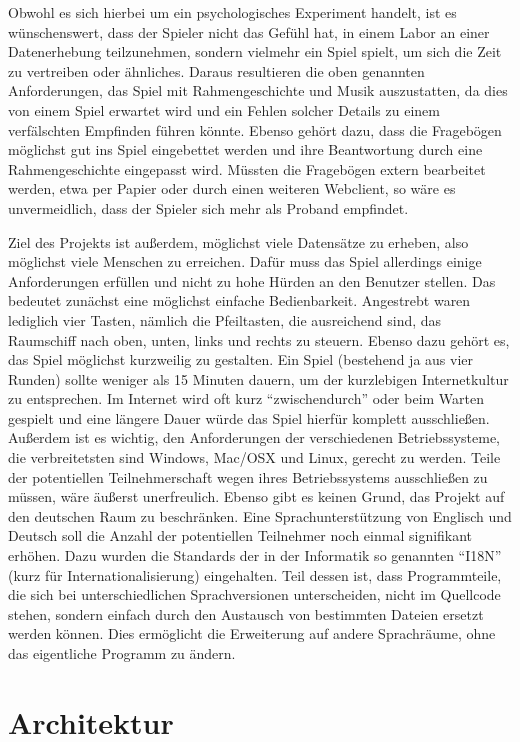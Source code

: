 \documentclass[a4paper,12pt]{scrartcl}
\begin{document}
Obwohl es sich hierbei um ein psychologisches Experiment handelt, ist es wünschenswert,
dass der Spieler nicht das Gefühl hat, in einem Labor an einer Datenerhebung
teilzunehmen, sondern vielmehr ein Spiel spielt, um sich die Zeit zu vertreiben oder
ähnliches. Daraus resultieren die oben genannten Anforderungen, das Spiel mit
Rahmengeschichte und Musik auszustatten, da dies von einem Spiel erwartet wird und
ein Fehlen solcher Details zu einem verfälschten Empfinden führen könnte. Ebenso
gehört dazu, dass die Fragebögen möglichst gut ins Spiel eingebettet werden und ihre
Beantwortung durch eine Rahmengeschichte eingepasst wird. Müssten die Fragebögen
extern bearbeitet werden, etwa per Papier oder durch einen weiteren Webclient, so wäre es
unvermeidlich, dass der Spieler sich mehr als Proband empfindet.

Ziel des Projekts ist außerdem, möglichst viele Datensätze zu erheben, also möglichst viele
Menschen zu erreichen. Dafür muss das Spiel allerdings einige Anforderungen erfüllen
und nicht zu hohe Hürden an den Benutzer stellen. Das bedeutet zunächst eine möglichst
einfache Bedienbarkeit. Angestrebt waren lediglich vier Tasten, nämlich die Pfeiltasten, die
ausreichend sind, das Raumschiff nach oben, unten, links und rechts zu steuern. Ebenso
dazu gehört es, das Spiel möglichst kurzweilig zu gestalten. Ein Spiel (bestehend ja aus
vier Runden) sollte weniger als 15 Minuten dauern, um der kurzlebigen Internetkultur zu
entsprechen. Im Internet wird oft kurz "`zwischendurch"' oder beim Warten gespielt und eine
längere Dauer würde das Spiel hierfür komplett ausschließen. Außerdem ist es wichtig, den
Anforderungen der verschiedenen Betriebssysteme, die verbreitetsten sind Windows, Mac/OSX und Linux, gerecht zu werden. Teile der potentiellen Teilnehmerschaft wegen ihres
Betriebssystems ausschließen zu müssen, wäre äußerst unerfreulich. Ebenso gibt es keinen
Grund, das Projekt auf den deutschen Raum zu beschränken. Eine Sprachunterstützung
von Englisch und Deutsch soll die Anzahl der potentiellen Teilnehmer noch einmal
signifikant erhöhen. Dazu wurden die Standards der in der Informatik so genannten "`I18N"'
(kurz für Internationalisierung) eingehalten. Teil dessen ist, dass Programmteile, die sich
bei unterschiedlichen Sprachversionen unterscheiden, nicht im Quellcode stehen, sondern
einfach durch den Austausch von bestimmten Dateien ersetzt werden können. Dies
ermöglicht die Erweiterung auf andere Sprachräume, ohne das eigentliche Programm zu
ändern.

\section{Architektur}
\end{document}
